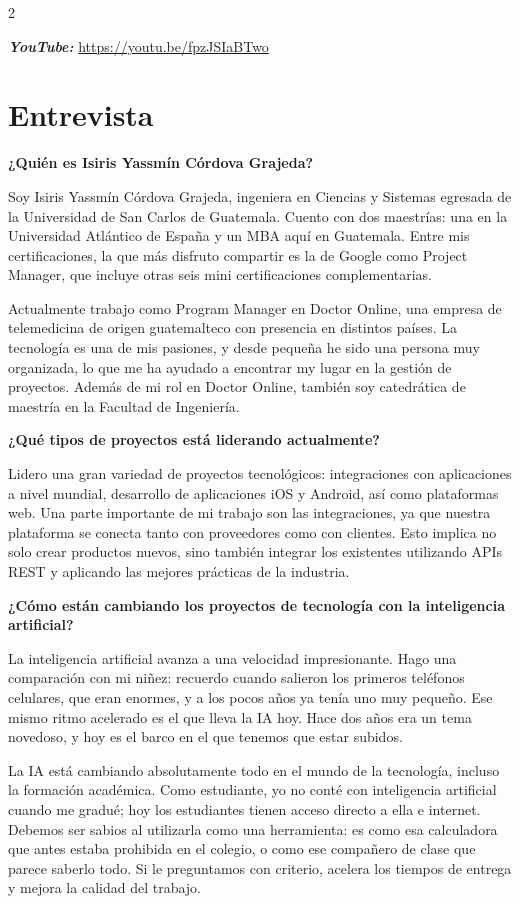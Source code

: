 \documentclass[10pt,spanish,Letterpaper,openany]{book}
\let\origtextbf\textbf
\renewcommand{\textbf}[1]{{\color{textlinetitle}\origtextbf{#1}}}
\begin{document}
\begin {multicols}{2}

\textbf{\emph{YouTube:}} \url{https://youtu.be/fpzJSIaBTwo}

\section{Entrevista}\label{entrevista}

\textbf{¿Quién es Isiris Yassmín Córdova Grajeda?}

Soy Isiris Yassmín Córdova Grajeda, ingeniera en Ciencias y Sistemas egresada de la Universidad de San Carlos de Guatemala. Cuento con dos maestrías: una en la Universidad Atlántico de España y un MBA aquí en Guatemala. Entre mis certificaciones, la que más disfruto compartir es la de Google como Project Manager, que incluye otras seis mini certificaciones complementarias.

Actualmente trabajo como Program Manager en Doctor Online, una empresa de telemedicina de origen guatemalteco con presencia en distintos países. La tecnología es una de mis pasiones, y desde pequeña he sido una persona muy organizada, lo que me ha ayudado a encontrar my lugar en la gestión de proyectos. Además de mi rol en Doctor Online, también soy catedrática de maestría en la Facultad de Ingeniería.

\textbf{¿Qué tipos de proyectos está liderando actualmente?}

Lidero una gran variedad de proyectos tecnológicos: integraciones con aplicaciones a nivel mundial, desarrollo de aplicaciones iOS y Android, así como plataformas web. Una parte importante de mi trabajo son las integraciones, ya que nuestra plataforma se conecta tanto con proveedores como con clientes. Esto implica no solo crear productos nuevos, sino también integrar los existentes utilizando APIs REST y aplicando las mejores prácticas de la industria.

\textbf{¿Cómo están cambiando los proyectos de tecnología con la inteligencia artificial?}

La inteligencia artificial avanza a una velocidad impresionante. Hago una comparación con mi niñez: recuerdo cuando salieron los primeros teléfonos celulares, que eran enormes, y a los pocos años ya tenía uno muy pequeño. Ese mismo ritmo acelerado es el que lleva la IA hoy. Hace dos años era un tema novedoso, y hoy es el barco en el que tenemos que estar subidos.

La IA está cambiando absolutamente todo en el mundo de la tecnología, incluso la formación académica. Como estudiante, yo no conté con inteligencia artificial cuando me gradué; hoy los estudiantes tienen acceso directo a ella e internet. Debemos ser sabios al utilizarla como una herramienta: es como esa calculadora que antes estaba prohibida en el colegio, o como ese compañero de clase que parece saberlo todo. Si le preguntamos con criterio, acelera los tiempos de entrega y mejora la calidad del trabajo.


\end{multicols}
\end{document}
